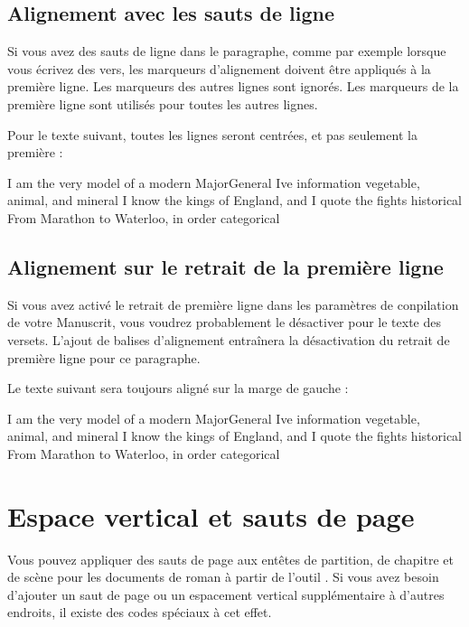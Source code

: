 \documentclass[a4paper,11pt,french]{sphinxmanual}
\begin{document}
\subsection{Alignement avec les sauts de ligne}
\label{\detokenize{usage_format:alignment-with-line-breaks}}
\sphinxAtStartPar
Si vous avez des sauts de ligne dans le paragraphe, comme par exemple lorsque vous écrivez des vers, les marqueurs d’alignement doivent être appliqués à la première ligne. Les marqueurs des autres lignes sont ignorés. Les marqueurs de la première ligne sont utilisés pour toutes les autres lignes.

\sphinxAtStartPar
Pour le texte suivant, toutes les lignes seront centrées, et pas seulement la première :

\begin{sphinxVerbatim}[commandchars=\\\{\}]
\PYGZgt{}\PYGZgt{} I am the very model of a modern Major\PYGZhy{}General \PYGZlt{}\PYGZlt{}
I\PYGZsq{}ve information vegetable, animal, and mineral
I know the kings of England, and I quote the fights historical
From Marathon to Waterloo, in order categorical
\end{sphinxVerbatim}


\subsection{Alignement sur le retrait de la première ligne}
\label{\detokenize{usage_format:alignment-with-first-line-indent}}
\sphinxAtStartPar
Si vous avez activé le retrait de première ligne dans les paramètres de conpilation de votre Manuscrit, vous voudrez probablement le désactiver pour le texte des versets. L’ajout de balises d’alignement entraînera la désactivation du retrait de première ligne pour ce paragraphe.

\sphinxAtStartPar
Le texte suivant sera toujours aligné sur la marge de gauche :

\begin{sphinxVerbatim}[commandchars=\\\{\}]
I am the very model of a modern Major\PYGZhy{}General \PYGZlt{}\PYGZlt{}
I\PYGZsq{}ve information vegetable, animal, and mineral
I know the kings of England, and I quote the fights historical
From Marathon to Waterloo, in order categorical
\end{sphinxVerbatim}


\section{Espace vertical et sauts de page}
\label{\detokenize{usage_format:vertical-space-and-page-breaks}}\label{\detokenize{usage_format:a-fmt-break}}
\sphinxAtStartPar
Vous pouvez appliquer des sauts de page aux en\sphinxhyphen{}têtes de partition, de chapitre et de scène pour les documents de roman à partir de l’outil . Si vous avez besoin d’ajouter un saut de page ou un espacement vertical supplémentaire à d’autres endroits, il existe des codes spéciaux à cet effet.
\end{document}
